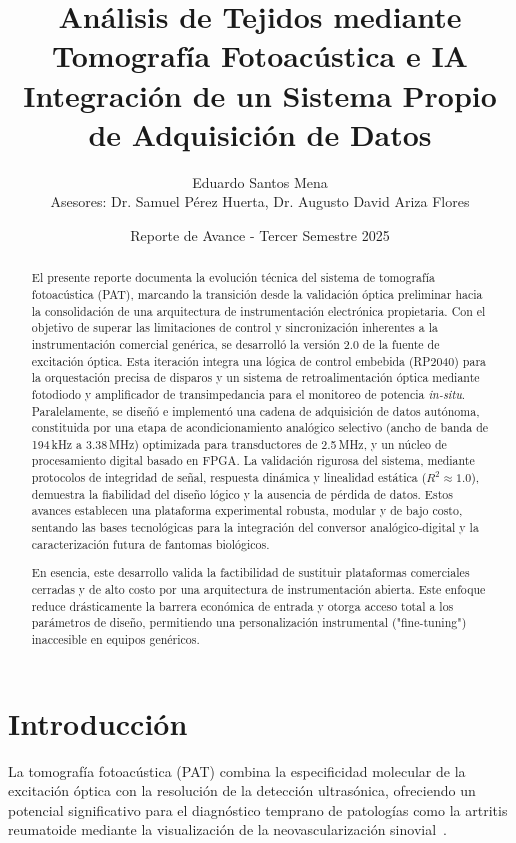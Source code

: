 \documentclass[12pt,letterpaper]{article}
\title{Análisis de Tejidos mediante Tomografía Fotoacústica e IA\\
Integración de un Sistema Propio de Adquisición de Datos}
\author{Eduardo Santos Mena \\ Asesores: Dr. Samuel Pérez Huerta, Dr. Augusto David Ariza Flores}
\date{Reporte de Avance - Tercer Semestre 2025}
\begin{document}
\maketitle

\begin{abstract}
\noindent
El presente reporte documenta la evolución técnica del sistema de tomografía fotoacústica (PAT), marcando la transición desde la validación óptica preliminar hacia la consolidación de una arquitectura de instrumentación electrónica propietaria. Con el objetivo de superar las limitaciones de control y sincronización inherentes a la instrumentación comercial genérica, se desarrolló la versión 2.0 de la fuente de excitación óptica. Esta iteración integra una lógica de control embebida (RP2040) para la orquestación precisa de disparos y un sistema de retroalimentación óptica mediante fotodiodo y amplificador de transimpedancia para el monitoreo de potencia \textit{in-situ}. Paralelamente, se diseñó e implementó una cadena de adquisición de datos autónoma, constituida por una etapa de acondicionamiento analógico selectivo (ancho de banda de 194\,kHz a 3.38\,MHz) optimizada para transductores de 2.5\,MHz, y un núcleo de procesamiento digital basado en FPGA. La validación rigurosa del sistema, mediante protocolos de integridad de señal, respuesta dinámica y linealidad estática ($R^2 \approx 1.0$), demuestra la fiabilidad del diseño lógico y la ausencia de pérdida de datos. Estos avances establecen una plataforma experimental robusta, modular y de bajo costo, sentando las bases tecnológicas para la integración del conversor analógico-digital y la caracterización futura de fantomas biológicos.

En esencia, este desarrollo valida la factibilidad de sustituir plataformas comerciales cerradas y de alto costo por una arquitectura de instrumentación abierta. Este enfoque reduce drásticamente la barrera económica de entrada y otorga acceso total a los parámetros de diseño, permitiendo una personalización instrumental ("fine-tuning") inaccesible en equipos genéricos.

\end{abstract}

\newpage
\section{Introducción}

La tomografía fotoacústica (PAT) combina la especificidad molecular de la excitación óptica con la resolución de la detección ultrasónica, ofreciendo un potencial significativo para el diagnóstico temprano de patologías como la artritis reumatoide mediante la visualización de la neovascularización sinovial~\cite{lin_emerging_2022}. 
\end{document}
